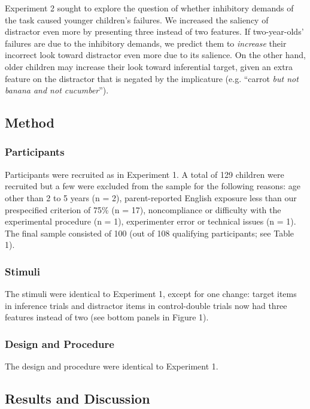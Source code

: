 \documentclass[a4paper,man,apacite,floatsintext]{apa6}
\begin{document}
Experiment 2 sought to explore the question of whether inhibitory
demands of the task caused younger children's failures. We increased the
saliency of distractor even more by presenting three instead of two
features. If two-year-olds' failures are due to the inhibitory demands,
we predict them to \emph{increase} their incorrect look toward
distractor even more due to its salience. On the other hand, older
children may increase their look toward inferential target, given an
extra feature on the distractor that is negated by the implicature (e.g.
``carrot \emph{but not banana and not cucumber}'').

\subsection{Method}\label{method-1}

\subsubsection{Participants}\label{participants-1}

Participants were recruited as in Experiment 1. A total of 129 children
were recruited but a few were excluded from the sample for the following
reasons: age other than 2 to 5 years (n = 2), parent-reported English
exposure less than our prespecified criterion of 75\% (n = 17),
noncompliance or difficulty with the experimental procedure (n = 1),
experimenter error or technical issues (n = 1). The final sample
consisted of 100 (out of 108 qualifying participants; see Table 1).

\subsubsection{Stimuli}\label{stimuli}

The stimuli were identical to Experiment 1, except for one change:
target items in inference trials and distractor items in control-double
trials now had three features instead of two (see bottom panels in
Figure 1).

\subsubsection{Design and Procedure}\label{design-and-procedure}

The design and procedure were identical to Experiment 1.

\subsection{Results and Discussion}\label{results-and-discussion-1}
\end{document}

